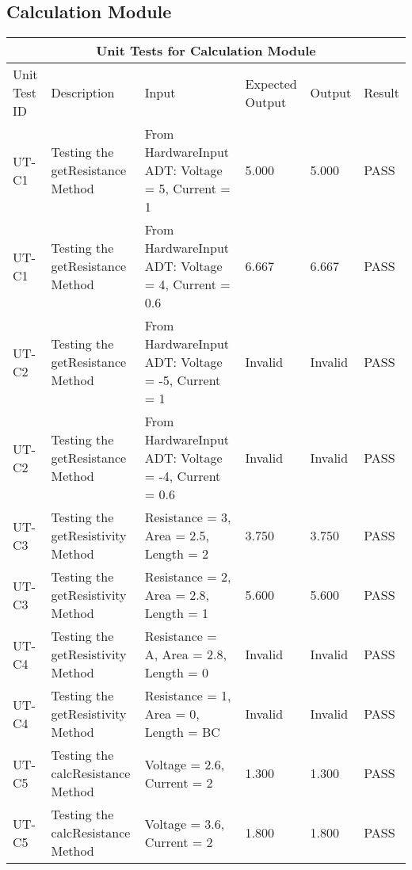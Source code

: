 \documentclass[12pt, titlepage]{article}
\begin{document}
\subsection{Calculation Module}
\begin{tabular}{ |p{1.5cm}||p{2.5cm}|p{3cm}|p{2cm}|p{2cm}|p{1.5cm}|}
  \hline
  \multicolumn{6}{|c|}{Unit Tests for Calculation Module} \\
  \hline
  Unit Test ID & Description & Input & Expected Output & Output & Result\\
  \hline
  UT-C1   & Testing the getResistance Method  &  From HardwareInput ADT: Voltage = 5, Current = 1 & 5.000 & 5.000 & PASS \\
  \hline
  UT-C1   & Testing the getResistance Method  &  From HardwareInput ADT: Voltage = 4, Current = 0.6 & 6.667 & 6.667 & PASS \\
  \hline
  UT-C2   & Testing the getResistance Method  &  From HardwareInput ADT: Voltage = -5, Current = 1 & Invalid & Invalid & PASS \\
  \hline
  UT-C2   & Testing the getResistance Method  &  From HardwareInput ADT: Voltage = -4, Current = 0.6 & Invalid & Invalid & PASS \\
  \hline
  UT-C3   & Testing the getResistivity Method  &  Resistance = 3, Area = 2.5, Length = 2 & 3.750 & 3.750 & PASS \\
  \hline
  UT-C3   & Testing the getResistivity Method  &  Resistance = 2, Area = 2.8, Length = 1 & 5.600 & 5.600 & PASS \\
  \hline
  UT-C4   & Testing the getResistivity Method  &  Resistance = A, Area = 2.8, Length = 0 & Invalid & Invalid & PASS \\
  \hline
  UT-C4   & Testing the getResistivity Method  &  Resistance = 1, Area = 0, Length = BC & Invalid & Invalid & PASS \\
  \hline
  UT-C5  & Testing the calcResistance Method  &  Voltage = 2.6, Current = 2 & 1.300 & 1.300 & PASS \\
  \hline
  UT-C5  & Testing the calcResistance Method  &  Voltage = 3.6, Current = 2 & 1.800 & 1.800 & PASS \\
  \hline
 \end{tabular}
\end{document}
